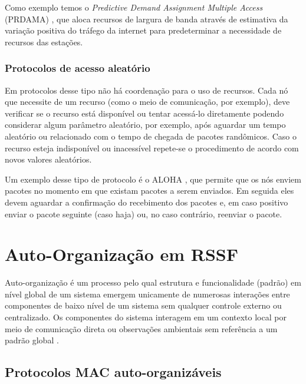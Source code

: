  Como exemplo temos o \textit{Predictive Demand Assignment Multiple Access} (PRDAMA) \cite{Jiang_apredictive}, que aloca recursos de largura de banda através de estimativa da variação positiva do tráfego da internet para predeterminar a necessidade de recursos das estações.

 \subsubsection{Protocolos de acesso aleatório}	

 Em protocolos desse tipo não há coordenação para o uso de recursos. Cada nó que necessite de um recurso (como o meio de comunicação, por exemplo), deve verificar se o recurso está disponível ou tentar acessá-lo diretamente podendo considerar algum parâmetro aleatório, por exemplo, após aguardar um tempo aleatório ou relacionado com o tempo de chegada de pacotes randômicos. Caso o recurso esteja indisponível ou inacessível repete-se o procedimento de acordo com novos valores aleatórios. 
 
 Um exemplo desse tipo de protocolo é o ALOHA \cite{Baccelli06analoha}, que permite que os nós enviem pacotes no momento em que existam pacotes a serem enviados. Em seguida eles devem aguardar a confirmação do recebimento dos pacotes e, em caso positivo enviar o pacote seguinte (caso haja) ou, no caso contrário, reenviar o pacote.
 
\section{Auto-Organização em RSSF}

 Auto-organização é um processo pelo qual estrutura e funcionalidade (padrão) em nível global de um sistema emergem unicamente de numerosas interações entre componentes de baixo nível de um sistema sem qualquer controle externo ou centralizado. Os componentes do sistema interagem em um contexto local por meio de comunicação direta ou observações ambientais sem referência a um padrão global \cite{Dressler2008}.
 
 \subsection{Protocolos MAC auto-organizáveis}
 
